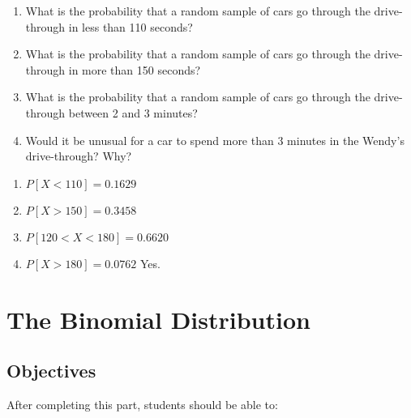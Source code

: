 \documentclass[11pt]{book}\usepackage[]{graphicx}\usepackage[]{color}
\begin{document}
\begin{exercises}
\begin{exercise}
\begin{enumerate}
\item What is the  probability that a random sample of cars go through the drive- \\ through in less than 110 seconds?
\item What is the  probability that a random sample of cars go through the drive- \\ through in more than 150 seconds?
\item What is the  probability that a random sample of cars go through the drive- \\ through between 2 and 3 minutes?
\item Would it be unusual for a car to spend more than 3 minutes in the Wendy's \\ drive-through?  Why?
\end{enumerate}

\end{exercise}
\begin{solution}  %

\begin{enumerate}
\item $P[ X < 110 ] = 0.1629 $
\item $P[ X > 150 ] = 0.3458 $
\item $P[ 120 < X < 180 ] = 0.6620 $
\item $P[ X > 180 ] = 0.0762 $ Yes.
\end{enumerate}

\end{solution}
	

\end{exercises}

 \onecolumn




\chapter{The Binomial Distribution}
\label{chap:ch7}

\section{Objectives}

After completing this part, students should be able to:

\end{document}
